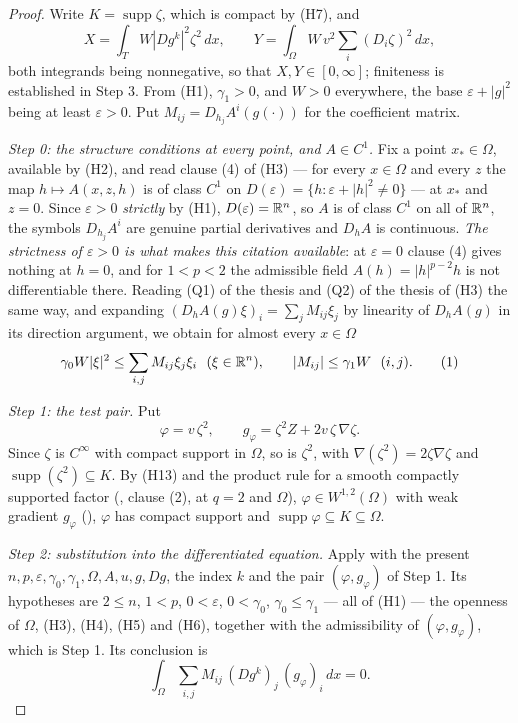 \begin{proof}
Write $K=\operatorname{supp}\zeta$, which is compact by (H7), and
\[
X=\int_TW|Dg^k|^2\zeta^2\,dx,
\qquad
Y=\int_\Omega W\,v^2\sum_i(D_i\zeta)^2\,dx ,
\]
both integrands being nonnegative, so that $X,Y\in[0,\infty]$; finiteness is
established in Step 3.  From (H1), $\gamma_1>0$, and $W>0$ everywhere, the base
$\varepsilon+|g|^2$ being at least $\varepsilon>0$.  Put
$M_{ij}=D_{h_j}A^i(g(\cdot))$ for the coefficient matrix.

\emph{Step 0: the structure conditions at every point, and $A\in C^1$.}  Fix a
point $x_\ast\in\Omega$, available by (H2), and read clause (4) of (H3) --- for
every $x\in\Omega$ and every $z$ the map $h\mapsto A(x,z,h)$ is of class $C^1$
on $D(\varepsilon)=\{h:\varepsilon+|h|^2\ne0\}$ --- at $x_\ast$ and $z=0$.
Since $\varepsilon>0$ \emph{strictly} by (H1), $D(\varepsilon)=\mathbb{R}^n$, so $A$ is
of class $C^1$ on all of $\mathbb{R}^n$, the symbols $D_{h_j}A^i$ are genuine partial
derivatives and $D_hA$ is continuous.  \emph{The strictness of
$\varepsilon>0$ is what makes this citation available}: at $\varepsilon=0$
clause (4) gives nothing at $h=0$, and for $1<p<2$ the admissible field
$A(h)=|h|^{p-2}h$ is not differentiable there.  Reading (Q1) of the thesis and
(Q2) of the thesis of (H3) the same way, and expanding
$(D_hA(g)\xi)_i=\sum_jM_{ij}\xi_j$ by linearity of $D_hA(g)$ in its direction
argument, we obtain for almost every $x\in\Omega$
\[
\gamma_0W|\xi|^2\le\sum_{i,j}M_{ij}\xi_j\xi_i\ \ (\xi\in\R^n),
\qquad
|M_{ij}|\le\gamma_1W\ \ (i,j) .
\tag{1}
\]

\emph{Step 1: the test pair.}  Put
\[
\varphi=v\,\zeta^2,
\qquad
g_\varphi=\zeta^2Z+2v\,\zeta\,\nabla\zeta .
\]
Since $\zeta$ is $C^\infty$ with compact support in $\Omega$, so is $\zeta^2$,
with $\nabla(\zeta^2)=2\zeta\nabla\zeta$ and
$\operatorname{supp}(\zeta^2)\subseteq K$.  By (H13) and the product rule for a
smooth compactly supported factor (, clause (2),
at $q=2$ and $\Omega$), $\varphi\in W^{1,2}(\Omega)$ with weak gradient
$g_\varphi$ (), $\varphi$ has compact support and
$\operatorname{supp}\varphi\subseteq K\subseteq\Omega$.

\emph{Step 2: substitution into the differentiated equation.}  Apply
 with the present
$n,p,\varepsilon,\gamma_0,\gamma_1,\Omega,A,u,g,Dg$, the index $k$ and the pair
$(\varphi,g_\varphi)$ of Step 1.  Its hypotheses are $2\le n$, $1<p$,
$0<\varepsilon$, $0<\gamma_0$, $\gamma_0\le\gamma_1$ --- all of (H1) --- the
openness of $\Omega$, (H3), (H4), (H5) and (H6), together with the admissibility
of $(\varphi,g_\varphi)$, which is Step 1.  Its conclusion is
\[
\int_\Omega\sum_{i,j}M_{ij}\,(Dg^k)_j\,(g_\varphi)_i\,dx=0 .
\tag{2}
\]


\end{proof}
